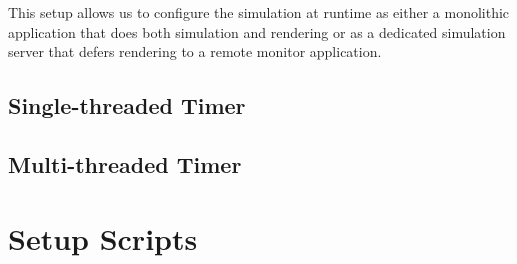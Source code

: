 This setup allows us to configure the simulation at runtime as either
a monolithic application that does both simulation and rendering or as
a dedicated simulation server that defers rendering to a remote
monitor application.



\subsection{Single-threaded Timer}

\subsection{Multi-threaded Timer}

\section{Setup Scripts}



